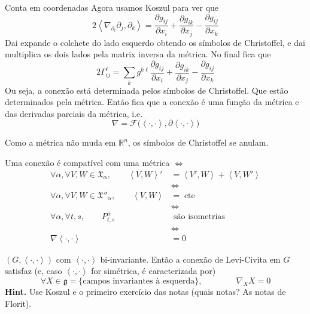 \begin{thing7}{Conta em coordenadas}\leavevmode
Agora usamos Koszul para ver que
\[2\left<\nabla_{\partial_i}\partial_j,\partial_k\right>=\frac{\partial g_{ij}}{\partial x_i}+\frac{\partial g_{ik}}{\partial x_j}-\frac{\partial g_{ij}}{\partial x_k}\]
Dai expande o colchete do lado esquerdo obtendo os símbolos de Christoffel, e dai multiplica os dois lados pela matrix inversa da métrica.
No final fica que
\[2\Gamma_{ij}^\ell=\sum_k g^{k\ell}\frac{\partial g_{ij}}{\partial x_i}+\frac{\partial g_{ik}}{\partial x_j}-\frac{\partial g_{ij}}{\partial x_k}\]
Ou seja, a conexão está determinada pelos símbolos de Christoffel. Que estão determinados pela métrica. Então fica que a conexão é uma função da métrica e das derivadas parciais da métrica, i.e.
\[\nabla=\mathcal{F}\Big(\left<\cdot,\cdot\right>,\partial \left<\cdot,\cdot\right>\Big)\]
\end{thing7}

\begin{coro}\leavevmode
Como a métrica não muda em \(\mathbb{R}^n\), os símbolos de Christoffel se anulam.
\end{coro}

\begin{exercise}\leavevmode
Uma conexão é compatível com uma métrica \(\iff\) 
\begin{align*}
\forall \alpha, \forall V,W \in \mathfrak{X}_\alpha,\qquad \left<V,W\right>'&=\left<V',W\right>+\left<V,W'\right>\\
&\iff\\
\forall \alpha, \forall V,W \in \mathfrak{X}''_\alpha,\qquad \left<V,W\right>&=\operatorname{cte}\\
&\iff\\
\forall \alpha, \forall t,s,\qquad  P_{t,s}^\alpha &\text{ são isometrias} \\
&\iff\\
\nabla \left<\cdot,\cdot\right>&=0
\end{align*}
\end{exercise}

\begin{exercise}\leavevmode
\((G,\left<\cdot,\cdot\right>)\) com \(\left<\cdot,\cdot\right>\) bi-invariante. Então a conexão de Levi-Civita em \(G\) satisfaz (e, caso \(\left<\cdot,\cdot\right>\) for simétrica, é caracterizada por)
\[\forall X \in \mathfrak{g}=\{\text{campos invariantes à esquerda}\}, \qquad \qquad \nabla_XX=0\]
\textbf{Hint.} Use Koszul e o primeiro exercício das notas (quais notas? As notas de Florit).
\end{exercise}

